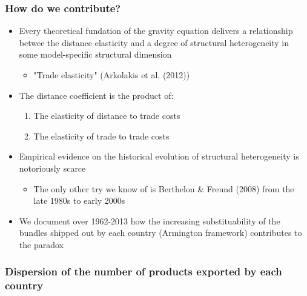 \documentclass{beamer}
\newcommand{\noteLA}[1]{\textcolor{blue}{\footnotesize\textit{{noteLA: #1}}}} %
\def\noteLA #1{} %
\begin{document}
\begin{frame}[plain]\frametitle{How do we contribute?}
	\noteLA{Say here: world may be getting smaller while at the same time the elasticity of trade to distance may be non-decreasing. This is where ambiguity in distance puzzle appears.}
\begin{itemize}
	\item Every theoretical fundation of the gravity equation delivers a relationship betwee the distance elasticity and a degree of structural heterogeneity in some model-specific structural dimension
		\begin{itemize}
			\item "Trade elasticity" (Arkolakis et al. (2012))
		\end{itemize}
	\item The distance coefficient is the product of:
	\begin{enumerate}
		\item The elasticity of distance to trade costs
		\item The elasticity of trade to trade costs
	\end{enumerate}
	\item Empirical evidence on the historical evolution of structural heterogeneity is notoriously scarce
		\begin{itemize}
			\item The only other try we know of is Berthelon \& Freund (2008) from the late 1980s to early 2000s
		\end{itemize}
	\item We document over 1962-2013 how the increasing substituability of the bundles shipped out by each country (Armington framework) contributes to the paradox
\end{itemize}
\end{frame}



\begin{frame}[plain]\frametitle{Dispersion of the number of products exported by each country}
\begin{figure}
	\begin{center}
		\setlength{\fboxrule}{1pt} %
		\setlength{\fboxsep}{.1in} %
	\end{center}
\end{figure}
\end{frame}
\end{document}
